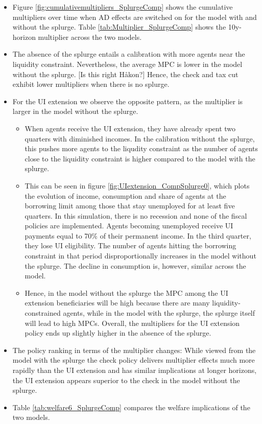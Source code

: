 \documentclass[\econtexRoot/HAFiscal]{subfiles}
\begin{document}
\begin{itemize}
	\item Figure \ref{fig:cumulativemultipliers_SplurgeComp} shows the cumulative multipliers over time when AD effects are switched on for the model with and without the splurge. Table \ref{tab:Multiplier_SplurgeComp} shows the 10y-horizon multiplier across the two models.
	\item The absence of the splurge entails a calibration with more agents near the liquidity constraint. Nevertheless, the average MPC is lower in the model without the splurge. [Is this right Håkon?] Hence, the check and tax cut exhibit lower multipliers when there is no splurge.
	\item For the UI extension we observe the opposite pattern, as the multiplier is larger in the model without the splurge.
	\begin{itemize}
		\item When agents receive the UI extension, they have already spent two quarters with diminished incomes. In the calibration without the splurge, this pushes more agents to the liqudity constraint as the number of agents close to the liquidity constraint is higher compared to the model with the splurge. 
		\item This can be seen in figure \ref{fig:UIextension_CompSplurge0}, which plots the evolution of income, consumption and share of agents at the borrowing limit among those that stay unemployed for at least five quarters. In this simulation, there is no recession and none of the fiscal policies are implemented. Agents becoming unemployed receive UI payments equal to 70\% of their permanent income. In the third quarter, they lose UI eligibility. The number of agents hitting the borrowing constraint in that period disproportionally increases in the model without the splurge. The decline in consumption is, however, similar across the model.
		\item Hence, in the model without the splurge the MPC among the UI extension beneficiaries will be high because there are many liquidity-constrained agents, while in the model with the splurge, the splurge itself will lead to high MPCs. Overall, the multipliers for the UI extension policy ends up slightly higher in the absence of the splurge. 
	\end{itemize}
	\item The policy ranking in terms of the multiplier changes: While viewed from the model with the splurge the check policy delivers multiplier effects much more rapidly than the UI extension and has similar implications at longer horizons, the UI extension appears superior to the check in the model without the splurge. 
	\item Table \ref{tab:welfare6_SplurgeComp} compares the welfare implications of the two models. 

\end{itemize}
\end{document}
